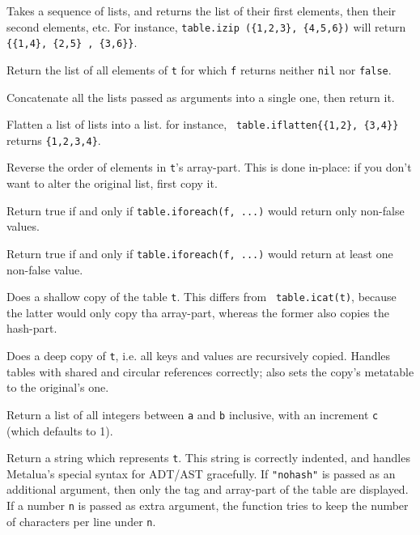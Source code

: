 
Takes a sequence of lists, and returns the
list of their first elements, then their second elements, etc. For
instance, {\tt table.izip (\{1,2,3\}, \{4,5,6\})} will return
{\tt\{\{1,4\}, \{2,5\} , \{3,6\}\}}.


Return the list of all elements of {\tt t} for which {\tt f} returns
neither {\tt nil} nor {\tt false}.


Concatenate all the lists passed as arguments into a single one, then
return it.


Flatten a list of lists into a list. for instance, {\tt
  table.iflatten\{\{1,2\}, \{3,4\}\}} returns {\tt\{1,2,3,4\}}.

Reverse the order of elements in {\tt t}'s array-part. This is done
in-place: if you don't want to alter the original list, first copy
it.


Return true if and only if {\tt table.iforeach(f, ...)} would return only
non-false values.


Return true if and only if {\tt table.iforeach(f, ...)} would return
at least one non-false value.


Does a shallow copy of the table {\tt t}. This differs from {\tt
  table.icat(t)}, because the latter would only copy tha array-part,
whereas the former also copies the hash-part.


Does a deep copy of {\tt t}, i.e. all keys and values are recursively
copied. Handles tables with shared and circular references correctly;
also sets the copy's metatable to the original's one.


Return a list of all integers between {\tt a} and {\tt b} inclusive,
with an increment {\tt c} (which defaults to 1).


Return a string which represents {\tt t}. This string is correctly
indented, and handles Metalua's special syntax for ADT/AST
gracefully. If {\tt"nohash"} is passed as an additional argument, then
only the tag and array-part of the table are displayed. If a number
{\tt n} is passed as extra argument, the function tries to keep the
number of characters per line under {\tt n}.

